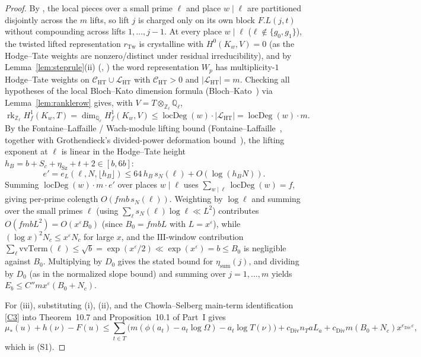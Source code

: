 \documentclass[11pt]{amsart}
\newcommand{\Z}{\mathbb{Z}}
\newcommand{\Q}{\mathbb{Q}}
\newcommand{\eps}{\varepsilon}
\newcommand{\Sha}{\mathrm{III}}
\DeclareMathOperator{\rk}{rk}
\theoremstyle{plain}
\theoremstyle{definition}
\numberwithin{equation}{section}
\begin{document}
\begin{proof}
By , the local pieces over a small prime $\ell$ and place $w\mid\ell$ are
partitioned disjointly across the $m$ lifts, so lift $j$ is charged only on its own block
$F.L(j,t)$ without compounding across lifts $1,\dots,j-1$. At every place $w\mid\ell$
($\ell\notin\{g_0,g_1\}$), the twisted lifted representation $r_{\mathrm{Tw}}$ is crystalline
with $H^0(K_w,V)=0$ (as the Hodge--Tate weights are nonzero/distinct under residual
irreducibility), and by Lemma~\ref{lem:steprule}(ii) (, )
the word representation $W_p$ has multiplicity-$1$ Hodge--Tate weights on
$\mathcal C_{\mathrm{HT}}\cup\mathcal L_{\mathrm{HT}}$ with $\mathcal C_{\mathrm{HT}}>0$ and
$|\mathcal L_{\mathrm{HT}}|=m$. Checking all hypotheses of the local Bloch--Kato dimension formula
(Bloch--Kato~\cite[Prop.~3.8, Cor.~3.8.4]{bloch-kato}) via Lemma~\ref{lem:ranklerow} gives, with
$V=T\otimes_{\Z_\ell}\Q_\ell$,
\[
\rk_{\Z_\ell} H^1_f(K_w,T)=\dim_{\Q_\ell} H^1_f(K_w,V)
\le \operatorname{locDeg}(w)\cdot |\mathcal L_{\mathrm{HT}}|=\operatorname{locDeg}(w)\cdot m.
\]
By the Fontaine--Laffaille / Wach-module lifting bound
(Fontaine--Laffaille~\cite[Thm.~4.3, \S8]{fontaine-laffaille}, together with Grothendieck's
divided-power deformation bound~\cite[Ch.~V \S4]{grothendieck1974}), the lifting exponent at $\ell$
is linear in the Hodge--Tate height $h_B=b+S_c+\eta_{\mathrm{Sz}}+t+2\in[b,6b]$:
\[
e'=e_L(\ell,N,\lfloor h_B\rfloor)\le 64\,h_B\,s_N(\ell)+O(\log(h_B N)).
\]
Summing $\operatorname{locDeg}(w)\cdot m\cdot e'$ over places $w\mid\ell$ uses
$\sum_{w\mid\ell}\operatorname{locDeg}(w)=f$, giving per-prime colength $O(f m b\,s_N(\ell))$.
Weighting by $\log\ell$ and summing over the small primes $\ell$ (using
$\sum_\ell s_N(\ell)\log\ell\ll L^2$) contributes $O(fmbL^2)=O(x^\eps B_0)$ (since $B_0=fmbL$ with
$L=x^\eps$), while $(\log x)^2 N_c\le x^\eps N_c$ for large $x$, and the $\Sha$-window
contribution $\sum_\ell \mathrm{vvTerm}(\ell)\le\sqrt{b}=\exp(x^\eps/2)\ll\exp(x^\eps)=b\le B_0$
is negligible against $B_0$. Multiplying by $D_0$ gives the stated bound for $\eta_{\mathrm{sum}}(j)$,
and dividing by $D_0$ (as in the normalized slope bound) and summing over $j=1,\dots,m$ yields
$E_b\le C'' m x^\eps(B_0+N_c)$.

For (iii), substituting (i), (ii), and the Chowla--Selberg main-term identification \ref{C3} into
Theorem~10.7 and Proposition~10.1 of Part~I gives
\[
\mu_\ast(u)+h(\nu)-F(u)\le\sum_{t\in T}\bigl(m(\phi(a_t)-a_t\log\Omega)-a_t\log T(\nu)\bigr)
+c_{\mathrm{Div}}n_TaL_a+c_{\mathrm{Div}}m(B_0+N_c)x^{e_{\mathrm{Div}}\eps},
\]
which is \textup{(S1)}.
\end{proof}
\end{document}
